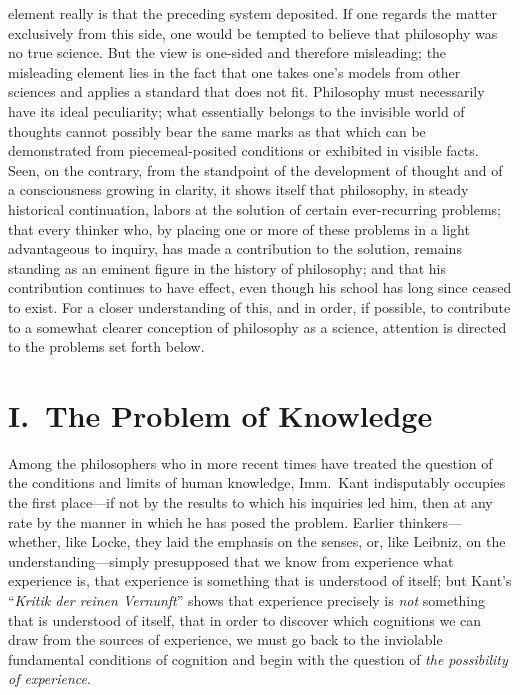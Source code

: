 \documentclass[12pt]{article}
\begin{document}
element really is that the preceding system deposited. If one regards the
matter exclusively from this side, one would be tempted to believe that
philosophy was no true science. But the view is one-sided and therefore
misleading; the misleading element lies in the fact that one takes one's
models from other sciences and applies a standard that does not fit.
Philosophy must necessarily have its ideal peculiarity; what essentially
belongs to the invisible world of thoughts cannot possibly bear the same
marks as that which can be demonstrated from piecemeal-posited conditions
or exhibited in visible facts. Seen, on the contrary, from the standpoint
of the development of thought and of a consciousness growing in clarity,
it shows itself that philosophy, in steady historical continuation,
labors at the solution of certain ever-recurring problems; that every
thinker who, by placing one or more of these problems in a light
advantageous to inquiry, has made a contribution to the solution, remains
standing as an eminent figure in the history of philosophy; and that his
contribution continues to have effect, even though his school has long
since ceased to exist. For a closer understanding of this, and in order,
if possible, to contribute to a somewhat clearer conception of philosophy
as a science, attention is directed to the problems set forth below.


\section*{I.\ The Problem of Knowledge}
\label{sec:erkjendelse}

\noindent
Among the philosophers who in more recent times have treated the
question of the conditions and limits of human knowledge, Imm.\ Kant
indisputably occupies the first place—if not by the results to which his
inquiries led him, then at any rate by the manner in which he has posed
the problem. Earlier thinkers—whether, like Locke, they laid the emphasis
on the senses, or, like Leibniz, on the understanding—simply presupposed
that we know from experience what experience is, that experience is
something that is understood of itself; but Kant's ``\emph{Kritik der
reinen Vernunft}'' shows that experience precisely is \emph{not} something
that is understood of itself, that in order to discover which cognitions
we can draw from the sources of experience, we must go back to the
inviolable fundamental conditions of cognition and begin with the question
of \emph{the possibility of experience}.
\end{document}
